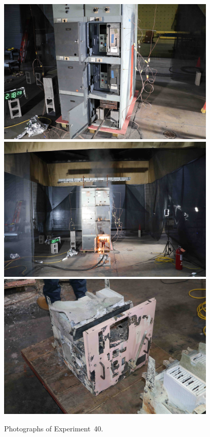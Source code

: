 \begin{figure}[p]
\centering
\includegraphics[height=2.75in]{../FIGURES/Test_40_setup} \\
\includegraphics[height=2.75in]{../FIGURES/Test_40_7_min_26_s} \\
\includegraphics[height=2.75in]{../FIGURES/Test_40_breaker}
\caption[Photographs of Experiment~40]{Photographs of Experiment~40.}
\label{fig:Test_40_photos}
\end{figure}


\clearpage

